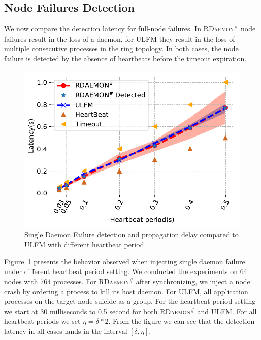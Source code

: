 \documentclass[sigconf]{acmart}
\newcommand{\ulfm}[0]{\textsc{ULFM}\xspace}
\newcommand{\ourwork}[0]{\textsc{RDaemon}\ensuremath{^\#}\xspace}
\begin{document}
\subsection{Node Failures Detection}
We now compare the detection latency for full-node failures. In \ourwork
node failures result in the loss of a daemon, for \ulfm they result in
the loss of multiple consecutive processes in the ring topology. In
both cases, the node failure is detected by the absence of heartbeats
before the timeout expiration.

\begin{figure}[h]
  \centering
  \includegraphics[width=\linewidth]{PRRTE_ULFM_comparision.pdf}
  \caption{Single Daemon Failure detection and propagation delay compared to \ulfm with different heartbeat period}
  \label{fig:node_failure_hb}
\end{figure}

Figure~\ref{fig:node_failure_hb} presents the behavior observed when injecting single daemon failure under different heartbeat period setting. We conducted the experiments on 64 nodes with 764 processes. For \ourwork after synchronizing, we inject a node crash by ordering a process to kill its host daemon. For \ulfm,
all application processes on the target node suicide as a group.
For the heartbeat period setting we start at 30 milliseconds to 0.5 second for both \ourwork and \ulfm. For all heartbeat periods we set $ \eta = \delta * 2 $. From the figure we can see that the detection latency in all cases lands in the interval $[\delta,\eta]$.
\end{document}
